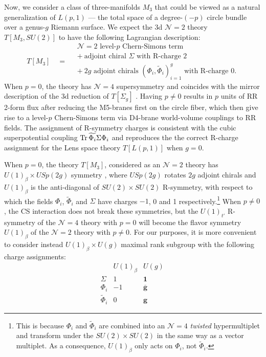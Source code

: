 \documentclass[hyper,letterpaper]{JHEP3}
\def\tilde{\widetilde}
\renewcommand{\bar}{\overline}
\def\CN{{\mathcal N}}
\newcommand{\Tr}{{\rm Tr}}
\begin{document}
Now, we consider a class of three-manifolds $M_3$ that could be viewed as a natural generalization of $L(p,1)$ --- the total space of a degree-$(-p)$ circle bundle over a genus-$g$ Riemann surface. We expect the 3d $\CN=2$ theory $T[M_3,SU(2)]$ to have the following Lagrangian description:
\begin{equation}
	T[M_3] \quad = \quad
	\boxed{\begin{array}{c}
	\CN=2 \text{ level-$p$ Chern-Simons term }\\
	+~\text{adjoint chiral $\Sigma$ with R-charge 2 }\\
	+~\text{$2g$ adjoint chirals $(\Phi_i,\tilde{\Phi}_i)_{i=1}^g$ with R-charge 0}.
	\end{array}}
	\label{TCircFib}
\end{equation}
When $p=0$, the theory has $\CN=4$ supersymmetry and coincides with the mirror description of the 3d reduction of $T[\Sigma_g]$ \cite{Benini:2010uu}. Having $p\neq 0$ results in $p$ units of RR 2-form flux after reducing the M5-branes first on the circle fiber, which then give rise to a level-$p$ Chern-Simons term via D4-brane world-volume couplings to RR fields. The assignment of R-symmetry charges is consistent with the cubic superpotential coupling $\Tr\,\tilde{\Phi_i}\Sigma\Phi_i$ and reproduces the the correct R-charge assignment for the Lens space theory $T[L(p,1)]$ when $g=0$.

When $p=0$, the theory $T[M_3]$, considered as an $\CN=2$ theory has $U(1)_{\beta}\times USp(2g)$ symmetry \cite{Benini:2010uu}, where $USp(2g)$ rotates $2g$ adjoint chirals and $U(1)_{\beta}$ is the anti-diagonal of $SU(2)\times SU(2)$ R-symmetry, with respect to which the fields $\Phi_i$, $\tilde{\Phi}_i$ and $\Sigma$ have charges $-1$, 0 and 1 respectively.\footnote{This is because $\Phi_i$ and $\tilde{\Phi}_i$ are combined into an $\CN=4$ \emph{twisted} hypermultiplet \cite{Benini:2010uu} and transform under the $SU(2)\times SU(2)$ in the same way as a vector multiplet. As a consequence, $U(1)_{\beta}$ only acts on $\Phi_i$, not $\tilde{\Phi}_i$.} When $p\neq 0$, the CS interaction does not break these symmetries, but the $U(1)_{t'}$ R-symmetry of the $\CN=4$ theory with $p=0$ will become the flavor symmetry $U(1)_\beta$ of the $\CN=2$ theory with $p\neq 0$. For our purposes, it is more convenient to consider instead $U(1)_{\beta}\times U(g)$ maximal rank subgroup with the following charge assignments:
\begin{equation}
	\begin{array}{c|cc}
		 & U(1)_{\beta} & U(g) \\
		\hline
		\Sigma & 1 & \mathbf{1} \\
		\Phi_i & -1 & \mathbf{\bar g} \\
		\tilde\Phi_i & 0 & \mathbf{g}
	\end{array}\,
\end{equation}
\end{document}
